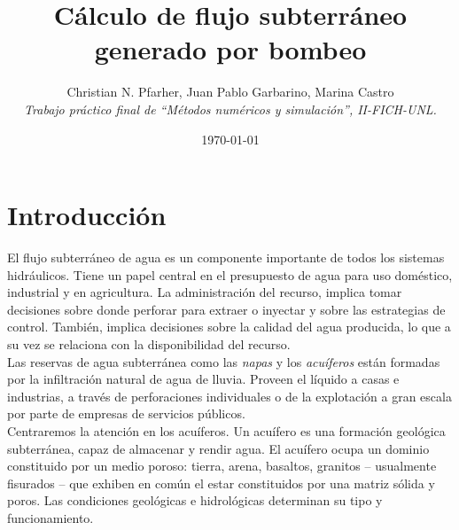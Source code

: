 \documentclass[10pt,a4paper,final]{article}
\begin{document}
\title{Cálculo de flujo subterráneo generado por bombeo}
\author{Christian N. Pfarher, Juan Pablo Garbarino, Marina Castro\\
\textit{Trabajo práctico final de ``Métodos numéricos y simulación'', II-FICH-UNL.}}
\date{\today}
\maketitle
\newpage
\tableofcontents
\newpage
\listoffigures %
\newpage
\section{Introducción}
El flujo subterráneo de agua es un componente importante de todos los sistemas hidráulicos. Tiene un papel central en el presupuesto de agua para uso doméstico, industrial y en agricultura. La administración del recurso, implica tomar decisiones sobre donde perforar para extraer o inyectar y sobre las estrategias de control. También, implica decisiones sobre la calidad del agua producida, lo que a su vez se relaciona con la disponibilidad del recurso.\\
Las reservas de agua subterránea como las \emph{napas} y los \emph{acuíferos} están formadas por la infiltración natural de agua de lluvia. Proveen el líquido a casas e industrias, a través de perforaciones individuales o de la explotación a gran escala por parte de empresas de servicios públicos.\\
Centraremos la atención en los acuíferos. Un acuífero es una formación geológica subterránea, capaz de almacenar y rendir agua. El acuífero ocupa un dominio constituido por un medio poroso: tierra, arena, basaltos, granitos – usualmente fisurados – que exhiben en común el estar constituidos por una matriz sólida y poros. Las condiciones geológicas e hidrológicas determinan su tipo y funcionamiento.
\end{document}
